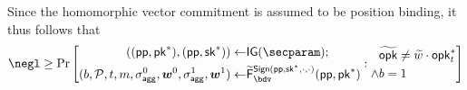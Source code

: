   Since the homomorphic vector commitment is assumed to be position binding, it thus follows that
  \begin{equation}
    \negl \geq \Pr\left[\begin{aligned}((\params,\pk^*),(\params,\sk^*)) \gets& \IG(\secparam);\\ (b,\pubkeys,t,m,\aggsig^0,\vec{w}^0,\aggsig^1,\vec{w}^1)\gets& \widetilde\fork^{\sign(\params,\sk^*,\cdot,\cdot)}_\bdv(\params,\pk^*)\end{aligned} :\begin{aligned} &\widetilde\opk \neq \widetilde w \cdot \opk^*_{t} \\ \land& b=1\end{aligned}\right]\label{opkstardifferentisnegl}
  \end{equation}
  
